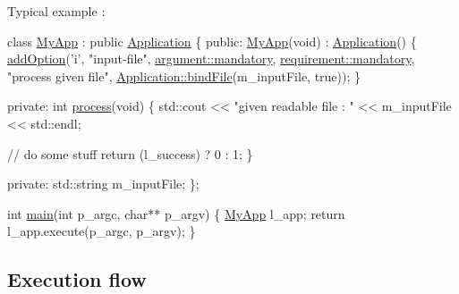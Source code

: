 Typical example \+: 
\begin{DoxyCodeInclude}
\textcolor{keyword}{class }\hyperlink{classMyApp}{MyApp} : \textcolor{keyword}{public} \hyperlink{classxtd_1_1Application_a2d911d40f42dc2928275538541b91633}{Application}
 \{
 \textcolor{keyword}{public}:
   \hyperlink{classMyApp}{MyApp}(\textcolor{keywordtype}{void}) :
     \hyperlink{classxtd_1_1Application_a2d911d40f42dc2928275538541b91633}{Application}()
   \{
     \hyperlink{classxtd_1_1Application_a7cea42a03984ceed3bae129ff9e1ef54}{addOption}(\textcolor{charliteral}{'i'}, \textcolor{stringliteral}{"input-file"},
               \hyperlink{classxtd_1_1Application_a672c075ed901e463609077d571a714c7ac5e3b9675d114c21ad3367d318f6aa95}{argument::mandatory},
               \hyperlink{classxtd_1_1Application_a49c0397e9fd22067e3a536443a17fe24ac5e3b9675d114c21ad3367d318f6aa95}{requirement::mandatory},
               \textcolor{stringliteral}{"process given file"},
               \hyperlink{classxtd_1_1Application_ab10f6dde0bf4034dff7eafe8a45c2029}{Application::bindFile}(m\_inputFile, \textcolor{keyword}{true}));
   \}

 \textcolor{keyword}{private}:
   \textcolor{keywordtype}{int} \hyperlink{classxtd_1_1Application_aef6043d47982bc1983a84e2c8a53f0cd}{process}(\textcolor{keywordtype}{void})
   \{
     std::cout << \textcolor{stringliteral}{"given readable file : "} << m\_inputFile << std::endl;

     \textcolor{comment}{// do some stuff}
     \textcolor{keywordflow}{return} (l\_success) ? 0 : 1;
   \}

 \textcolor{keyword}{private}:
   std::string m\_inputFile;
\};


\textcolor{keywordtype}{int} \hyperlink{main_8cc_af847876e048f60529674b0f221f6edc1}{main}(\textcolor{keywordtype}{int} p\_argc, \textcolor{keywordtype}{char}** p\_argv)
\{
  \hyperlink{classMyApp}{MyApp} l\_app;
  \textcolor{keywordflow}{return} l\_app.execute(p\_argc, p\_argv);
\}
\end{DoxyCodeInclude}
\hypertarget{classxtd_1_1Application_sec_execution_flow}{}\subsection{Execution flow}\label{classxtd_1_1Application_sec_execution_flow}

